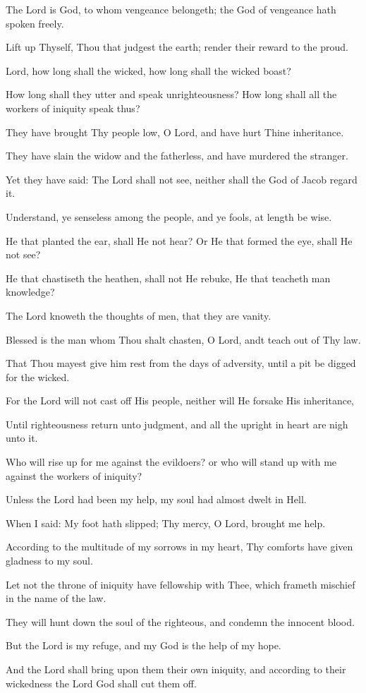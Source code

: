 The Lord is God, to whom vengeance belongeth; the God of vengeance hath spoken freely.

Lift up Thyself, Thou that judgest the earth; render their reward to the proud.

Lord, how long shall the wicked, how long shall the wicked boast?

How long shall they utter and speak unrighteousness? How long shall all the workers of iniquity speak thus?

They have brought Thy people low, O Lord, and have hurt Thine inheritance.

They have slain the widow and the fatherless, and have murdered the stranger.

Yet they have said: The Lord shall not see, neither shall the God of Jacob regard it.

Understand, ye senseless among the people, and ye fools, at length be wise.

He that planted the ear, shall He not hear? Or He that formed the eye, shall He not see?

He that chastiseth the heathen, shall not He rebuke, He that teacheth man knowledge?

The Lord knoweth the thoughts of men, that they are vanity.

Blessed is the man whom Thou shalt chasten, O Lord, andt teach out of Thy law.

That Thou mayest give him rest from the days of adversity, until a pit be digged for the wicked.

For the Lord will not cast off His people, neither will He forsake His inheritance,

Until righteousness return unto judgment, and all the upright in heart are nigh unto it.

Who will rise up for me against the evildoers? or who will stand up with me against the workers of iniquity?

Unless the Lord had been my help, my soul had almost dwelt in Hell.

When I said: My foot hath slipped; Thy mercy, O Lord, brought me help.

According to the multitude of my sorrows in my heart, Thy comforts have given gladness to my soul.

Let not the throne of iniquity have fellowship with Thee, which frameth mischief in the name of the law.

They will hunt down the soul of the righteous, and condemn the innocent blood.

But the Lord is my refuge, and my God is the help of my hope.

And the Lord shall bring upon them their own iniquity, and according to their wickedness the Lord God shall cut them off.
